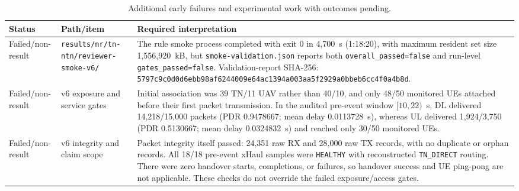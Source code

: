 \begin{table}[t]
\centering
\footnotesize
\caption{Additional early failures and experimental work with outcomes pending.}
\label{tab:audited_pending_provisional}
\begin{tabular}{p{} p{} p{}}
\hline
Status & Path/item & Required interpretation \\
\hline
Failed/non-result & \texttt{results/\allowbreak nr/\allowbreak tn-\allowbreak ntn/\allowbreak reviewer-\allowbreak smoke-\allowbreak v6/\allowbreak } & The rule smoke process completed with exit 0 in 4,700~s (1:18:20), with maximum resident set size 1,556,920~kB, but \texttt{smoke-\allowbreak validation.json} reports both \texttt{overall\_\allowbreak passed=false} and run-level \texttt{gates\_\allowbreak passed=false}.  Validation-report SHA-256: \texttt{5797c9c0d0d6ebb9\allowbreak 8af6244009e64ac1\allowbreak 394a003aa5f2929a\allowbreak 0bbeb6cc4f0a4b8d}. \\
Failed/non-result & v6 exposure and service gates & Initial association was 39 TN/11 UAV rather than 40/10, and only 48/50 monitored UEs attached before their first packet transmission.  In the audited pre-event window $[10,22)$~s, DL delivered 14,218/15,000 packets (PDR 0.9478667; mean delay 0.0113728~s), whereas UL delivered 1,924/3,750 (PDR 0.5130667; mean delay 0.0324832~s) and reached only 30/50 monitored UEs. \\
Failed/non-result & v6 integrity and claim scope & Packet integrity itself passed: 24,351 raw RX and 28,000 raw TX records, with no duplicate or orphan records.  All 18/18 pre-event xHaul samples were \texttt{HEALTHY} with reconstructed \texttt{TN\_DIRECT} routing.  There were zero handover starts, completions, or failures, so handover success and UE ping-pong are not applicable.  These checks do not override the failed exposure/access gates. \\
\hline
\end{tabular}
\end{table}

